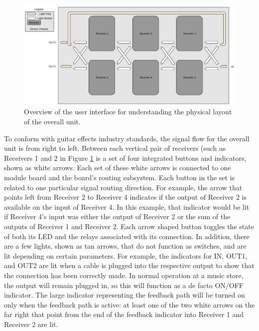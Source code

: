 \documentclass{article}
\begin{document}
	\begin{figure}
		\centering
		\includegraphics[width = \textwidth]{PR4Images/UIOverview.png}
		\caption{Overview of the user interface for understanding the physical layout of the overall unit.}
		\label{fig:OverallUILayout}
	\end{figure}

	To conform with guitar effects industry standards, the signal flow for the overall unit is from right to left.  Between each vertical pair of receivers (such as Receivers 1 and 2 in Figure \ref{fig:OverallUILayout} is a set of four integrated buttons and indicators, shown as white arrows.  Each set of these white arrows is connected to one module board and the board's routing subsystem.  Each button in the set is related to one particular signal routing direction.  For example, the arrow that points left from Receiver 2 to Receiver 4 indicates if the output of Receiver 2 is available on the input of Receiver 4.  In this example, that indicator would be lit if Receiver 4's input was either the output of Receiver 2 or the sum of the outputs of Receiver 1 and Receiver 2.  Each arrow shaped button toggles the state of both its LED and the relays associated with its connection.  In addition, there are a few lights, shown as tan arrows, that do not function as switches, and are lit depending on certain parameters.  For example, the indicators for IN, OUT1, and OUT2 are lit when a cable is plugged into the respective output to show that the connection has been correctly made.  In normal operation at a music store, the output will remain plugged in, so this will function as a de facto ON/OFF indicator.  The large indicator representing the feedback path will be turned on only when the feedback path is active: at least one of the two white arrows on the far right that point from the end of the feedback indicator into Receiver 1 and Receiver 2 are lit.

	\color{black}
\end{document}
